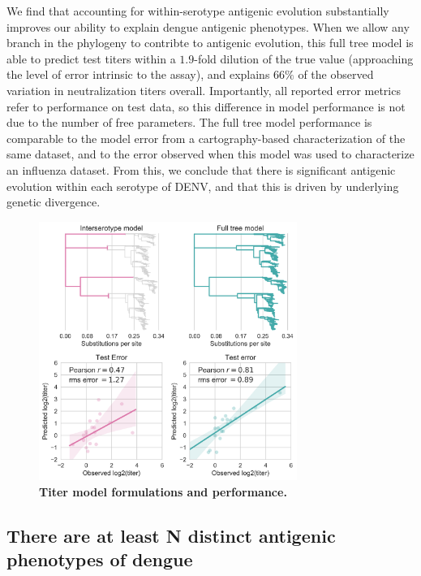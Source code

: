 \documentclass[11pt,oneside,letterpaper]{article}
\begin{document}
We find that accounting for within-serotype antigenic evolution substantially improves our ability to explain dengue antigenic phenotypes.
When we allow any branch in the phylogeny to contribte to antigenic evolution, this full tree model is able to predict test titers within a $1.9$-fold dilution of the true value (approaching the level of error intrinsic to the assay), and explains $66\%$ of the observed variation in neutralization titers overall.
Importantly, all reported error metrics refer to performance on test data, so this difference in model performance is not due to the number of free parameters.
The full tree model performance is comparable to the model error from a cartography-based characterization of the same dataset, and to the error observed when this model was used to characterize an influenza dataset.
From this, we conclude that there is significant antigenic evolution within each serotype of DENV, and that this is driven by underlying genetic divergence.

\begin{figure}[h]
\centering
\includegraphics[width=0.75\textwidth]{../figures/png/titer_model_performance.png}
    \caption{\textbf{Titer model formulations and performance.}}
     \label{titer_model_performance}
\end{figure}


\subsection{There are at least N distinct antigenic phenotypes of dengue}
\end{document}
